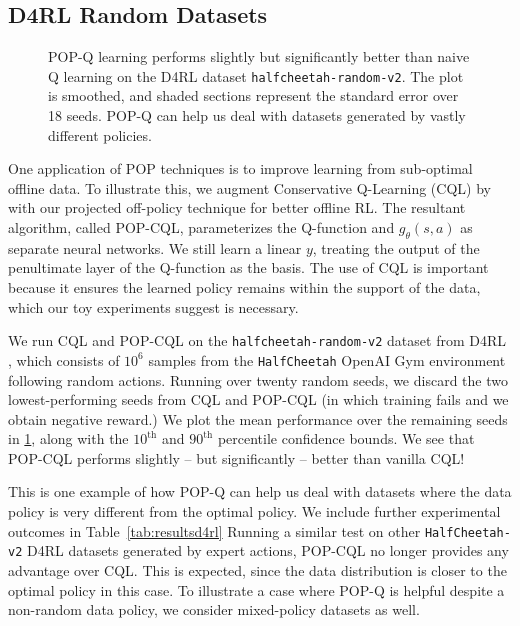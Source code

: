 \subsection{D4RL Random Datasets}

\begin{figure}[t]
  \centering
  
  \caption{
    POP-Q learning performs slightly but significantly better than naive Q learning on the D4RL dataset \texttt{halfcheetah-random-v2}. The plot is smoothed, and shaded sections represent the standard error over 18 seeds. POP-Q can help us deal with datasets generated by vastly different policies.}
  \label{fig:d4rl}
\end{figure}


One application of POP techniques is to improve learning from sub-optimal offline data. To illustrate this, we augment Conservative Q-Learning (CQL) by \citet{kumar2020cql} with our projected off-policy technique for better offline RL. The resultant algorithm, called POP-CQL, parameterizes the Q-function and $g_\theta(s, a)$ as separate neural networks. We still learn a linear $y$, treating the output of the penultimate layer of the Q-function as the basis. The use of CQL is important because it ensures the learned policy remains within the support of the data, which our toy experiments suggest is necessary.

We run CQL and POP-CQL on the \texttt{halfcheetah-random-v2} dataset from D4RL \citep{fu2020d4rl}, which consists of $10^6$ samples from the \texttt{HalfCheetah} OpenAI Gym \citep{openaigym} environment following random actions. Running over twenty random seeds, we discard the two lowest-performing seeds from CQL and POP-CQL (in which training fails and we obtain negative reward.) We plot the mean performance over the remaining seeds in \cref{fig:d4rl}, along with the $10^\text{th}$ and $90^\text{th}$ percentile confidence bounds. We see that POP-CQL performs slightly -- but significantly -- better than vanilla CQL!

This is one example of how POP-Q can help us deal with datasets where the data policy is very different from the optimal policy. We include further experimental outcomes in Table~\ref{tab:resultsd4rl}
Running a similar test on other \texttt{HalfCheetah-v2} D4RL datasets generated by expert actions, POP-CQL no longer provides any advantage over CQL. This is expected, since the data distribution is closer to the optimal policy in this case. To illustrate a case where POP-Q is helpful despite a non-random data policy, we consider mixed-policy datasets as well.

